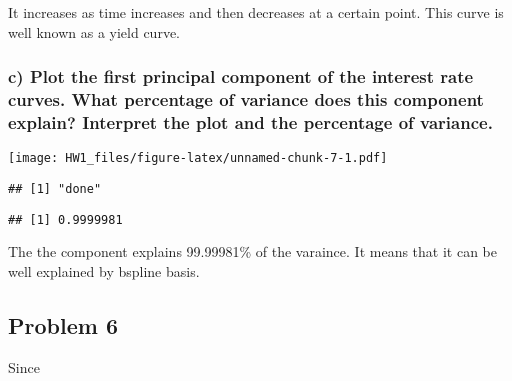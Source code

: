 \documentclass[
]{article}
\newenvironment{Shaded}{\begin{snugshade}}{\end{snugshade}}
\newcommand{\AttributeTok}[1]{\textcolor[rgb]{0.77,0.63,0.00}{#1}}
\newcommand{\DecValTok}[1]{\textcolor[rgb]{0.00,0.00,0.81}{#1}}
\newcommand{\FunctionTok}[1]{\textcolor[rgb]{0.00,0.00,0.00}{#1}}
\newcommand{\NormalTok}[1]{#1}
\newcommand{\OtherTok}[1]{\textcolor[rgb]{0.56,0.35,0.01}{#1}}
\newcommand{\SpecialCharTok}[1]{\textcolor[rgb]{0.00,0.00,0.00}{#1}}
\begin{document}
It increases as time increases and then decreases at a certain point.
This curve is well known as a yield curve.

\hypertarget{c-plot-the-first-principal-component-of-the-interest-rate-curves.-what-percentage-of-variance-does-this-component-explain-interpret-the-plot-and-the-percentage-of-variance.}{%
\subsubsection{c) Plot the first principal component of the interest
rate curves. What percentage of variance does this component explain?
Interpret the plot and the percentage of
variance.}\label{c-plot-the-first-principal-component-of-the-interest-rate-curves.-what-percentage-of-variance-does-this-component-explain-interpret-the-plot-and-the-percentage-of-variance.}}

\begin{Shaded}
\end{Shaded}

\texttt{[image: HW1\_files/figure-latex/unnamed-chunk-7-1.pdf]}

\begin{verbatim}
## [1] "done"
\end{verbatim}

\begin{Shaded}
\end{Shaded}

\begin{verbatim}
## [1] 0.9999981
\end{verbatim}

The the component explains 99.99981\% of the varaince. It means that it
can be well explained by bspline basis.

\hypertarget{problem-6}{%
\subsection{Problem 6}\label{problem-6}}

Since
\end{document}
